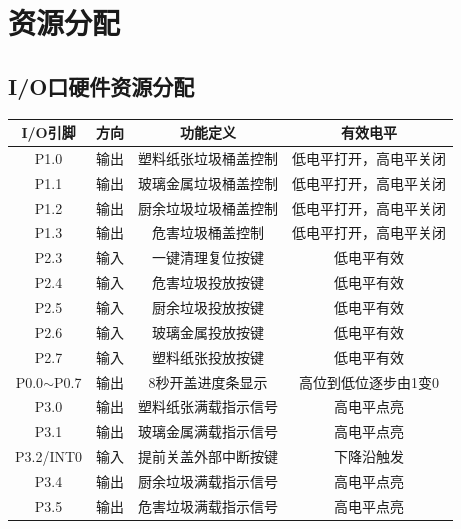 \documentclass[12pt,a4paper]{article}
\begin{document}
\section{资源分配}
\subsection{I/O口硬件资源分配}
\begin{table}[H]
    \centering
    \small
    \begin{tabular}{|c|c|c|c|}
        \hline
        I/O引脚 & 方向 & 功能定义 & 有效电平 \\
        \hline
        P1.0 & 输出 & 塑料纸张垃圾桶盖控制 & 低电平打开，高电平关闭 \\
        \hline
        P1.1 & 输出 & 玻璃金属垃圾桶盖控制 & 低电平打开，高电平关闭 \\
        \hline
        P1.2 & 输出 & 厨余垃圾垃圾桶盖控制 & 低电平打开，高电平关闭 \\
        \hline
        P1.3 & 输出 & 危害垃圾桶盖控制 & 低电平打开，高电平关闭 \\
        \hline
        P2.3 & 输入 & 一键清理复位按键 & 低电平有效 \\
        \hline
        P2.4 & 输入 & 危害垃圾投放按键 & 低电平有效 \\
        \hline
        P2.5 & 输入 & 厨余垃圾投放按键 & 低电平有效 \\
        \hline
        P2.6 & 输入 & 玻璃金属投放按键 & 低电平有效 \\
        \hline
        P2.7 & 输入 & 塑料纸张投放按键 & 低电平有效 \\
        \hline
        P0.0$\sim$P0.7 & 输出 & 8秒开盖进度条显示 & 高位到低位逐步由1变0 \\
        \hline
        P3.0 & 输出 & 塑料纸张满载指示信号 & 高电平点亮 \\
        \hline
        P3.1 & 输出 & 玻璃金属满载指示信号 & 高电平点亮 \\
        \hline
        P3.2/INT0 & 输入 & 提前关盖外部中断按键 & 下降沿触发 \\
        \hline
        P3.4 & 输出 & 厨余垃圾满载指示信号 & 高电平点亮 \\
        \hline
        P3.5 & 输出 & 危害垃圾满载指示信号 & 高电平点亮 \\
        \hline
    \end{tabular}
\end{table}
\end{document}
